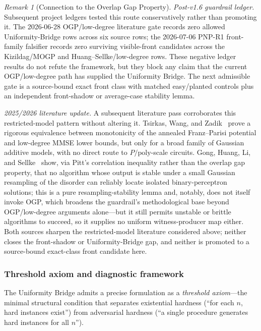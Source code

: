 \documentclass[aps,prd,twocolumn,superscriptaddress,nofootinbib]{revtex4-2}
\theoremstyle{definition}
\theoremstyle{remark}
\newtheorem{remark}[theorem]{Remark}
\begin{document}
\begin{remark}[Connection to the Overlap Gap Property]
\medskip\noindent\emph{Post-v1.6 guardrail ledger.}
Subsequent project ledgers tested this route conservatively rather than promoting it. The 2026-06-28 OGP/low-degree literature gate records zero allowed Uniformity-Bridge rows across six source rows; the 2026-07-06 PNP-R1 front-family falsifier records zero surviving visible-front candidates across the Kizildag/MOGP and Huang--Sellke/low-degree rows. These negative ledger results do not refute the framework, but they block any claim that the current OGP/low-degree path has supplied the Uniformity Bridge. The next admissible gate is a source-bound exact front class with matched easy/planted controls plus an independent front-shadow or average-case stability lemma.

\medskip\noindent\emph{2025/2026 literature update.}
A subsequent literature pass corroborates this restricted-model pattern without altering it. Tsirkas, Wang, and Zadik~\cite{TsirkasWangZadik2026} prove a rigorous equivalence between monotonicity of the annealed Franz--Parisi potential and low-degree MMSE lower bounds, but only for a broad family of Gaussian additive models, with no direct route to $P/\mathrm{poly}$-scale circuits. Gong, Huang, Li, and Sellke~\cite{GongHuangLiSellke2026} show, via Pitt's correlation inequality rather than the overlap gap property, that no algorithm whose output is stable under a small Gaussian resampling of the disorder can reliably locate isolated binary-perceptron solutions; this is a pure resampling-stability lemma and, notably, does not itself invoke OGP, which broadens the guardrail's methodological base beyond OGP/low-degree arguments alone---but it still permits unstable or brittle algorithms to succeed, so it supplies no uniform witness-producer map either. Both sources sharpen the restricted-model literature considered above; neither closes the front-shadow or Uniformity-Bridge gap, and neither is promoted to a source-bound exact-class front candidate here.
\end{remark}

\subsubsection*{Threshold axiom and diagnostic framework}

The Uniformity Bridge admits a precise formulation as a \emph{threshold axiom}---the minimal structural condition that separates existential hardness (``for each $n$, hard instances exist'') from adversarial hardness (``a single procedure generates hard instances for all $n$'').
\end{document}
